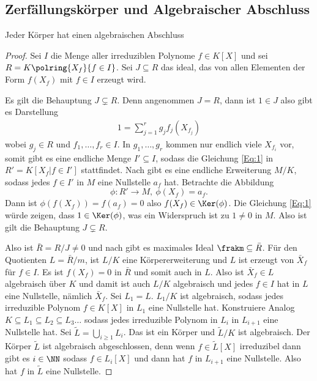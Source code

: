 \subsection{Zerfällungskörper und Algebraischer Abschluss}
\begin{Satz}
    Jeder Körper hat einen algebraischen Abschluss
\end{Satz}
\begin{proof}
    Sei \(I\) die Menge aller irreduziblen Polynome \(f\in K[X]\) und sei \(R=K\polring{X_f}{f\in I}\). Sei \(J\subseteq R\) das ideal, das von allen Elementen der Form \(f(X_f)\) mit \(f\in I\) erzeugt wird.
    
    Es gilt die Behauptung \(J\subsetneq R\). Denn angenommen \(J=R\), dann ist \(1\in J\) also gibt es Darstellung 
    \begin{align} 1=\sum_{j=1}^rg_jf_j(X_{f_j})\label{Eq:1}
    \end{align} wobei \(g_j\in R\) und \(f_1,\dots,f_r\in I\). In \(g_1,\dots,g_r\) kommen nur endlich viele \(X_{f_i}\) vor, somit gibt es eine endliche Menge \(I'\subseteq I\), sodass die Gleichung \ref{Eq:1} in \(R'=K[X_f| f\in I']\) stattfindet.
    Nach  gibt es eine endliche Erweiterung \(M/K\), sodass jedes \(f\in I'\) in \(M\) eine Nullstelle \(a_f\) hat. Betrachte die Abbildung \[\phi\colon R'\to M,\ \phi(X_f)=a_f.\]
    Dann ist \(\phi(f(X_f))=f(a_f)=0\) also \(f(X_f)\in \Ker(\phi)\). Die Gleichung \ref{Eq:1} würde zeigen, dass \(1\in \Ker(\phi)\), was ein Widerspruch ist zu \(1\neq 0\) in \(M\).
    Also ist gilt die Behauptung \(J\subsetneq R\).
    
    Also ist \(\bar R=R/J\neq 0\) und nach  gibt es maximales Ideal \(\frakm\subseteq \bar R\). Für den Quotienten \(L=\bar R/m\), ist \(L/K\) eine Körpererweiterung und \(L\) ist erzeugt von \(\bar X_f\) für \(f\in I\). Es ist \(f(X_f)=0\) in \(\bar R\) und somit auch in \(L\). Also ist \(\bar X_f\in L\) algebraisch über \(K\) und damit ist auch \(L/K\) algebraisch und jedes \(f\in I\) hat in \(L\) eine Nullstelle, nämlich \(\bar X_f\).
    Sei \(L_1=L\). \(L_1/K\) ist algebraisch, sodass jedes irreduzible Polynom \(f\in K[X]\) in \(L_1\) eine Nullstelle hat.
    Konstruiere Analog \(K\subseteq L_1\subseteq L_2\subseteq L_3\dots\) sodass jedes irreduzible Polynom in \(L_i\) in \(L_{i+1}\) eine Nullstelle hat. Sei \(\tilde L= \bigcup\limits_{i\geq 1}L_i\). Das ist  ein Körper und \(\tilde L/K\) ist algebraisch.
    Der Körper \(\tilde L\) ist algebraisch abgeschlossen, denn wenn \(f\in \tilde L[X]\) irreduzibel dann gibt es \(i\in\NN\) sodass \(f\in L_i[X]\) und dann hat \(f\) in \(L_{i+1}\) eine Nullstelle. Also hat \(f\) in \(\tilde L\) eine Nullstelle.
\end{proof}
